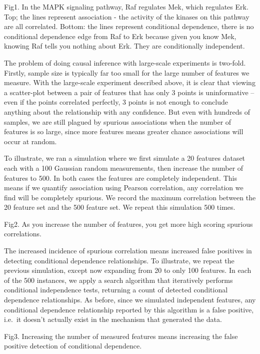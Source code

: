 \documentclass[]{article}
\begin{document}
Fig1. In the MAPK signaling pathway, Raf regulates Mek, which regulates
Erk. Top; the lines represent association - the activity of the kinases
on this pathway are all correlated. Bottom: the lines represent
conditional dependence, there is no conditional dependence edge from Raf
to Erk because given you know Mek, knowing Raf tells you nothing about
Erk. They are conditionally independent.

The problem of doing causal inference with large-scale experiments is
two-fold. Firstly, sample size is typically far too small for the large
number of features we measure. With the large-scale experiment described
above, it is clear that viewing a scatter-plot between a pair of
features that has only 3 points is uninformative -- even if the points
correlated perfectly, 3 points is not enough to conclude anything about
the relationship with any confidence. But even with hundreds of samples,
we are still plagued by spurious associations when the number of
features is so large, since more features means greater chance
associations will occur at random.

To illustrate, we ran a simulation where we first simulate a 20 features
dataset each with a 100 Gaussian random measurements, then increase the
number of features to 500. In both cases the features are completely
independent. This means if we quantify association using Pearson
correlation, any correlation we find will be completely spurious. We
record the maximum correlation between the 20 feature set and the 500
feature set. We repeat this simulation 500 times.

Fig2. As you increase the number of features, you get more high scoring
spurious correlations.

The increased incidence of spurious correlation means increased false
positives in detecting conditional dependence relationships. To
illustrate, we repeat the previous simulation, except now expanding from
20 to only 100 features. In each of the 500 instances, we apply a search
algorithm that iteratively performs conditional independence tests,
returning a count of detected conditional dependence relationships. As
before, since we simulated independent features, any conditional
dependence relationship reported by this algorithm is a false positive,
i.e.~it doesn't actually exist in the mechanism that generated the data.

Fig3. Increasing the number of measured features means increasing the
false positive detection of conditional dependence.
\end{document}
